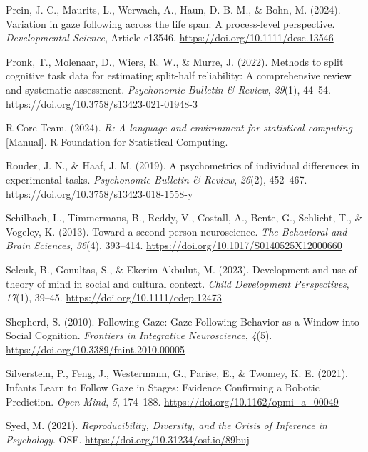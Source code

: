 \documentclass[
  man,floatsintext]{apa7}
\newlength{\cslhangindent}
\newenvironment{CSLReferences}[2] %
 {\begin{list}{}{%
  \setlength{\itemindent}{0pt}
  \setlength{\leftmargin}{0pt}
  \setlength{\parsep}{0pt}
  \ifodd #1
   \setlength{\leftmargin}{\cslhangindent}
   \setlength{\itemindent}{-1\cslhangindent}
  \fi
  \setlength{\itemsep}{#2\baselineskip}}}
 {\end{list}}
\begin{document}
\begin{CSLReferences}{1}{0}
Prein, J. C., Maurits, L., Werwach, A., Haun, D. B. M., \& Bohn, M. (2024). Variation in gaze following across the life span: {A} process-level perspective. \emph{Developmental Science}, Article e13546. \url{https://doi.org/10.1111/desc.13546}

Pronk, T., Molenaar, D., Wiers, R. W., \& Murre, J. (2022). Methods to split cognitive task data for estimating split-half reliability: {A} comprehensive review and systematic assessment. \emph{Psychonomic Bulletin \& Review}, \emph{29}(1), 44--54. \url{https://doi.org/10.3758/s13423-021-01948-3}

R Core Team. (2024). \emph{R: {A} language and environment for statistical computing} {[}Manual{]}. R Foundation for Statistical Computing.

Rouder, J. N., \& Haaf, J. M. (2019). A psychometrics of individual differences in experimental tasks. \emph{Psychonomic Bulletin \& Review}, \emph{26}(2), 452--467. \url{https://doi.org/10.3758/s13423-018-1558-y}

Schilbach, L., Timmermans, B., Reddy, V., Costall, A., Bente, G., Schlicht, T., \& Vogeley, K. (2013). Toward a second-person neuroscience. \emph{The Behavioral and Brain Sciences}, \emph{36}(4), 393--414. \url{https://doi.org/10.1017/S0140525X12000660}

Selcuk, B., Gonultas, S., \& Ekerim-Akbulut, M. (2023). Development and use of theory of mind in social and cultural context. \emph{Child Development Perspectives}, \emph{17}(1), 39--45. \url{https://doi.org/10.1111/cdep.12473}

Shepherd, S. (2010). Following {Gaze}: {Gaze-Following Behavior} as a {Window} into {Social Cognition}. \emph{Frontiers in Integrative Neuroscience}, \emph{4}(5). \url{https://doi.org/10.3389/fnint.2010.00005}

Silverstein, P., Feng, J., Westermann, G., Parise, E., \& Twomey, K. E. (2021). Infants {Learn} to {Follow Gaze} in {Stages}: {Evidence Confirming} a {Robotic Prediction}. \emph{Open Mind}, \emph{5}, 174--188. \url{https://doi.org/10.1162/opmi_a_00049}

Syed, M. (2021). \emph{Reproducibility, {Diversity}, and the {Crisis} of {Inference} in {Psychology}}. OSF. \url{https://doi.org/10.31234/osf.io/89buj}


\end{CSLReferences}
\end{document}
